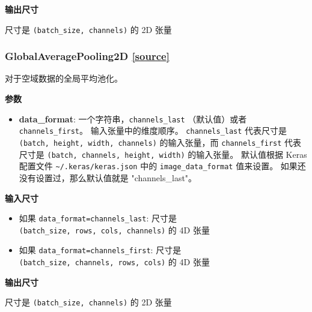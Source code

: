 \textbf{输出尺寸}

尺寸是 \texttt{(batch\_size,\ channels)} 的 2D 张量


\subsubsection{GlobalAveragePooling2D {\href{https://github.com/keras-team/keras/blob/master/keras/layers/pooling.py\#L510}{{[}source{]}}}}

\begin{Shaded}
\begin{Highlighting}[]
\OperatorTok{=}\NormalTok{)}
\end{Highlighting}
\end{Shaded}

对于空域数据的全局平均池化。

\textbf{参数}

\begin{itemize}
\tightlist
\item
  \textbf{data\_format}: 一个字符串，\texttt{channels\_last}
  （默认值）或者 \texttt{channels\_first}。 输入张量中的维度顺序。
  \texttt{channels\_last} 代表尺寸是
  \texttt{(batch,\ height,\ width,\ channels)} 的输入张量，而
  \texttt{channels\_first} 代表尺寸是
  \texttt{(batch,\ channels,\ height,\ width)} 的输入张量。 默认值根据
  Keras 配置文件 \texttt{\textasciitilde{}/.keras/keras.json} 中的
  \texttt{image\_data\_format} 值来设置。
  如果还没有设置过，那么默认值就是 "channels\_last"。
\end{itemize}

\textbf{输入尺寸}

\begin{itemize}
\tightlist
\item
  如果
  \texttt{data\_format=\textquotesingle{}channels\_last\textquotesingle{}}:
  尺寸是 \texttt{(batch\_size,\ rows,\ cols,\ channels)} 的 4D 张量
\item
  如果
  \texttt{data\_format=\textquotesingle{}channels\_first\textquotesingle{}}:
  尺寸是 \texttt{(batch\_size,\ channels,\ rows,\ cols)} 的 4D 张量
\end{itemize}

\textbf{输出尺寸}

尺寸是 \texttt{(batch\_size,\ channels)} 的 2D 张量

\newpage